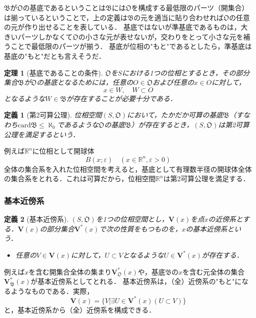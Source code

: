 \documentclass[a4paper,10pt,uplatex]{jsarticle}
\numberwithin{equation}{section}
\theoremstyle{mystyle}
\newtheorem{dfn}{定義}[section]
\newtheorem{thm}{定理}[section]
\newcommand{\gB}{\mathfrak{B}}
\newcommand{\gO}{\mathfrak{O}}
\begin{document}
$\gB$が$\gO$の基底であるということは$\gB$には$\gO$を構成する最低限のパーツ（開集合）は揃っているということで，上の定義は$\gB$の元を適当に貼り合わせれば$\gO$の任意の元が作り出せることを表している．
基底ではないが準基底であるものは，大きいパーツしかなくて$\gO$の小さな元が表せないが，交わりをとって小さな元を補うことで最低限のパーツが揃う．
基底が位相の"もと"であるとしたら，準基底は基底の"もと"だとも言えそうだ．

\begin{thm}[基底であることの条件]
    $\gO$を$S$における1つの位相とするとき，その部分集合$\gB$が$\gO$の基底となるためには，任意の$O\in\gO$および任意の$x\in O$に対して，
    \begin{equation}
        x \in W, \quad W \subset O
    \end{equation}
    となるような$W \in \gB$が存在することが必要十分である．
\end{thm}

\begin{dfn}[第2可算公理]
    位相空間$(S,\gO)$において，たかだか可算の基底$\gB$（すなわち$\mathrm{card}\gB \leq \aleph_0$であるような$\gO$の基底$\gB$）が存在するとき，$(S,\gO)$は第2可算公理を満足するという．
\end{dfn}

例えば$\mathbb{R}^n$に位相として開球体
\begin{equation}
    B(x;\varepsilon) \quad (x \in \mathbb{R}^n, \varepsilon > 0)
\end{equation}
全体の集合系を入れた位相空間を考えると，基底として有理数半径の開球体全体の集合系をとれる．これは可算だから，位相空間$\mathbb{R}^n$は第2可算公理を満足する．

\subsubsection{基本近傍系}
\begin{dfn}[基本近傍系]
    $(S,\gO)$を1つの位相空間とし，$\bm{V}(x)$を点$x$の近傍系とする．$\bm{V}(x)$の部分集合$\bm{V}^*(x)$で次の性質をもつものを，$x$の基本近傍系という．
    \begin{itemize}
        \item[] 任意の$V \in \bm{V}(x)$に対して，$U \subset V$となるような$U \in \bm{V}^*(x)$が存在する．
    \end{itemize}
\end{dfn}
例えば$x$を含む開集合全体の集まり$\bm{V}_\gO^*(x)$や，基底$\gB$の$x$を含む元全体の集合$\bm{V}_\gB^*(x)$が基本近傍系としてとれる．
基本近傍系は，（全）近傍系の"もと"になるようなものである．実際，
\begin{equation}
    \bm{V}(x) = \{V | \exists U \in \bm{V}^*(x) (U \subset V)\}
\end{equation}
と，基本近傍系から（全）近傍系を構成できる．
\end{document}
